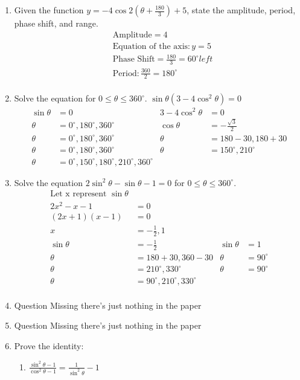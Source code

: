 \documentclass[paper=a4, fontsize=11pt]{scrartcl}
\begin{document}
\begin{enumerate}[resume]
    \item Given the function $y=-4\cos2(\theta+\frac{180}{3})+5$, state the amplitude, period, phase shift, and range.
    \begin{align*}
        &\text{Amplitude} = 4\\
        &\text{Equation of the axis}: y=5\\
        &\text{Phase Shift} = \frac{180}{3}=60^{\circ} left\\
        &\text{Period}: \frac{360}{2}=180^{\circ}\\
    \end{align*}
    \item Solve the equation for $0\le\theta\le 360^{\circ}$. $\sin\theta(3-4\cos^2\theta)=0$
    \begin{align*}
        \sin\theta&=0&3-4\cos^2\theta&=0\\
        \theta&=0^{\circ},180^{\circ},360^{\circ}&\cos\theta&=-\frac{\sqrt{3}}{2}\\
        \theta&=0^{\circ},180^{\circ},360^{\circ}&\theta&=180-30,180+30\\
        \theta&=0^{\circ},180^{\circ},360^{\circ}&\theta&=150^{\circ},210^{\circ}\\
        \theta&=0^{\circ},150^{\circ},180^{\circ},210^{\circ},360^{\circ}
    \end{align*}
    \item Solve the equation $2\sin^2\theta-\sin\theta-1=0$ for $0\le\theta\le360^{\circ}$.
    \begin{align*}
        \text{Let x represent }\sin\theta\\
        2x^2-x-1&=0\\
        (2x+1)(x-1)&=0\\
        x&=-\frac{1}{2},1\\
        \sin\theta&=-\frac{1}{2}&\sin\theta&=1\\
        \theta&=180+30,360-30&\theta&=90^{\circ}\\
        \theta&=210^{\circ},330^{\circ}&\theta&=90^{\circ}\\
        \theta&=90^{\circ},210^{\circ},330^{\circ}\\
    \end{align*}
    \item Question Missing there's just nothing in the paper
    \item Question Missing there's just nothing in the paper
    \item Prove the identity:
    \begin{enumerate}
        \item $\frac{\sin^2\theta-1}{\cos^2\theta-1}=\frac{1}{\sin^2\theta}-1$
        

\end{enumerate}
\end{enumerate}
\end{document}
